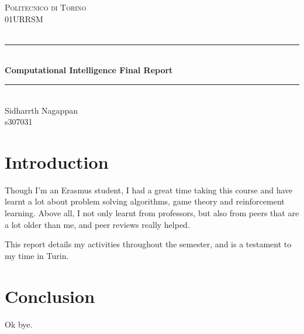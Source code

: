 \documentclass[12pt]{article}
\begin{document}
\begin{titlepage}

\newcommand{\HRule}{\rule{\linewidth}{0.5mm}} 							%
\center 
 
\textsc{\LARGE Politecnico di Torino}\\[1cm]

\textsc{\Large 01URRSM}\\[0.2cm]
\textsc{\large }\\[1cm] 										%
\HRule \\[0.8cm]
{ \huge \bfseries Computational Intelligence Final Report}\\[0.7cm]								%
\HRule \\[2cm]
\Large
Sidharrth Nagappan\\[0.5cm] 										%
s307031

\vfill 
\end{titlepage}

\tableofcontents

\newpage


\section{Introduction}

\large

Though I'm an Erasmus student, I had a great time taking this course and have learnt a lot about problem solving algorithms, game theory and reinforcement learning. Above all, I not only learnt from professors, but also from peers that are a lot older than me, and peer reviews really helped.

This report details my activities throughout the semester, and is a testament to my time in Turin.






\section{Conclusion}

Ok bye.





\newpage
% 
\end{document}
